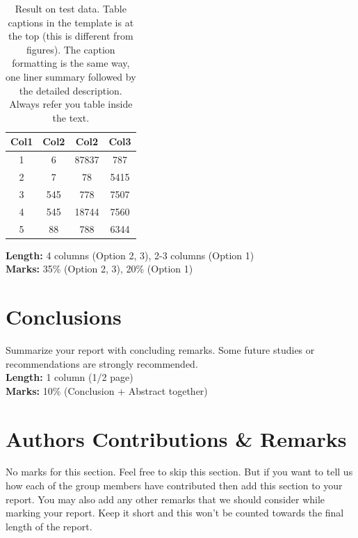\documentclass[conference]{IEEEtran}
\begin{document}
\begin{table}[bt]
\caption{Result on test data. Table captions in the template is at the top (this is different from figures). The caption formatting is the same way, one liner summary followed by the detailed description. Always refer you table inside the text.\label{tab:results}}
\centering
 \begin{tabular}{c c c c}
 \toprule
 Col1 & Col2 & Col2 & Col3 \\ [0.5ex]
 \midrule
 1 & 6 & 87837 & 787 \\
 2 & 7 & 78 & 5415 \\
 3 & 545 & 778 & 7507 \\
 4 & 545 & 18744 & 7560 \\
 5 & 88 & 788 & 6344 \\ [1ex]
 \bottomrule
 \end{tabular}
\end{table}

\noindent \textbf{Length:} 4 columns (Option 2, 3), 2-3 columns (Option 1)\\
\noindent \textbf{Marks:} 35\% (Option 2, 3), 20\% (Option 1)

\section{Conclusions} \label{section:conclusion}
Summarize your report with concluding remarks. Some future studies or recommendations are strongly recommended.\\

\noindent \textbf{Length:} 1 column (1/2 page)\\
\noindent \textbf{Marks:} 10\% (Conclusion + Abstract together)

\section{Authors Contributions \& Remarks}
No marks for this section. Feel free to skip this section. But if you want to tell us how each of the group members have contributed then add this section to your report. You may also add any other remarks that we should consider while marking your report. Keep it short and this won't be counted towards the final length of the report.



\end{document}
